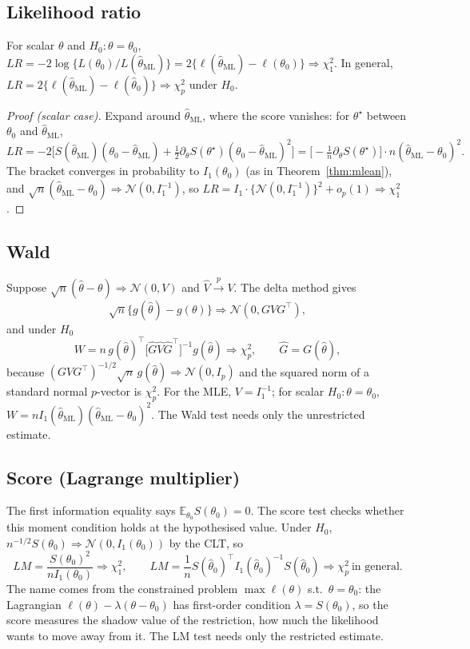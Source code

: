 \documentclass[11pt,a4paper]{article}
\newcommand{\E}{\mathbb{E}}
\newcommand{\N}{\mathcal{N}}
\newcommand{\cp}{\xrightarrow{\;p\;}}
\newcommand{\cd}{\Rightarrow}
\newcommand{\op}{o_p}
\newcommand{\thml}{\hat\theta_{\mathrm{ML}}}
\begin{document}
\subsection{Likelihood ratio}

\begin{theorem}\label{thm:lr}
For scalar $\theta$ and $H_0:\theta=\theta_0$, $LR=-2\log\{L(\theta_0)/L(\thml)\}=2\{\ell(\thml)-\ell(\theta_0)\}\cd\chi^2_1$. In general, $LR=2\{\ell(\thml)-\ell(\hat\theta_0)\}\cd\chi^2_p$ under $H_0$.
\end{theorem}

\begin{proof}[Proof \textup{(}scalar case\textup{)}]
Expand around $\thml$, where the score vanishes: for $\theta^\star$ between $\theta_0$ and $\thml$,
\[
LR=-2\Big[S(\thml)(\theta_0-\thml)+\tfrac12\partial_\theta S(\theta^\star)(\theta_0-\thml)^2\Big]=\Big[-\tfrac1n\partial_\theta S(\theta^\star)\Big]\cdot n(\thml-\theta_0)^2 .
\]
The bracket converges in probability to $I_1(\theta_0)$ (as in Theorem~\ref{thm:mlean}), and $\sqrt n(\thml-\theta_0)\cd\N(0,I_1^{-1})$, so $LR=I_1\cdot\{\N(0,I_1^{-1})\}^2+\op(1)\cd\chi^2_1$.
\end{proof}

\subsection{Wald}

Suppose $\sqrt n(\hat\theta-\theta)\cd\N(0,V)$ and $\hat V\cp V$. The delta method gives
\[
\sqrt n\{g(\hat\theta)-g(\theta)\}\cd\N(0,GVG^\top),
\]
and under $H_0$
\[
W=n\,g(\hat\theta)^\top\big[\hat G\hat V\hat G^\top\big]^{-1}g(\hat\theta)\cd\chi^2_p,\qquad\hat G=G(\hat\theta),
\]
because $(GVG^\top)^{-1/2}\sqrt n\,g(\hat\theta)\cd\N(0,I_p)$ and the squared norm of a standard normal $p$-vector is $\chi^2_p$. For the MLE, $V=I_1^{-1}$; for scalar $H_0:\theta=\theta_0$, $W=nI_1(\thml)(\thml-\theta_0)^2$. The Wald test needs only the unrestricted estimate.

\subsection{Score (Lagrange multiplier)}

The first information equality says $\E_{\theta_0}S(\theta_0)=0$. The score test checks whether this moment condition holds at the hypothesised value. Under $H_0$, $n^{-1/2}S(\theta_0)\cd\N(0,I_1(\theta_0))$ by the CLT, so
\[
LM=\frac{S(\theta_0)^2}{nI_1(\theta_0)}\cd\chi^2_1,\qquad LM=\frac1nS(\hat\theta_0)^\top I_1(\hat\theta_0)^{-1}S(\hat\theta_0)\cd\chi^2_p\ \text{in general}.
\]
The name comes from the constrained problem $\max\ell(\theta)$ s.t.\ $\theta=\theta_0$: the Lagrangian $\ell(\theta)-\lambda(\theta-\theta_0)$ has first-order condition $\lambda=S(\theta_0)$, so the score measures the shadow value of the restriction, how much the likelihood wants to move away from it. The LM test needs only the restricted estimate.
\end{document}
